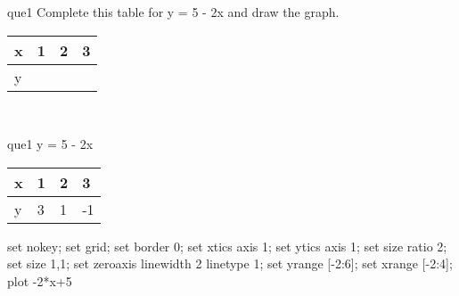 \documentclass[13.5pt, varwidth=true]{beamer}
\begin{document}
\begin{frame}[shrink=19,fragile]
	\begin{beamercolorbox}[rounded=true, left, shadow=true,wd=14.8cm]{que1}
		 Complete this table for y = 5 - 2x and draw the graph. \\[0.3cm] \renewcommand{\arraystretch}{1.2}\begin{tabular}{|C|C|C|C|} \hline x & 1 & 2 & 3 \\ \hline y & & & \\ \hline \end{tabular}\\[0.3cm]
	\end{beamercolorbox}
\end{frame}
\begin{frame}[shrink=19,fragile]
	\begin{beamercolorbox}[rounded=true, left, shadow=true,wd=14.8cm]{que1}
		y = 5 - 2x\renewcommand{\arraystretch}{1.2}\begin{tabular}{|C|C|C|C|} \hline x & 1 & 2 & 3 \\ \hline y & 3 & 1 & -1\\ \hline \end{tabular}\begin{gnuplot}[terminal=pdf] set nokey; set grid; set border 0; set xtics axis 1; set ytics axis 1; set size ratio 2; set size 1,1; set zeroaxis linewidth 2 linetype 1; set yrange [-2:6]; set xrange [-2:4]; plot -2*x+5 \end{gnuplot}
	\end{beamercolorbox}
\end{frame}
\end{document}
